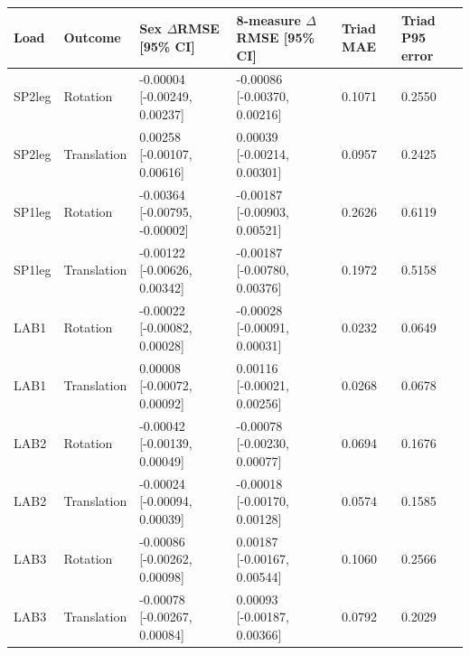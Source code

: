 \begin{tabular}{llllll}
\toprule
Load & Outcome & Sex $\Delta$RMSE [95\% CI] & 8-measure $\Delta$RMSE [95\% CI] & Triad MAE & Triad P95 error \\
\midrule
SP2leg & Rotation & -0.00004 [-0.00249, 0.00237] & -0.00086 [-0.00370, 0.00216] & 0.1071 & 0.2550 \\
SP2leg & Translation & 0.00258 [-0.00107, 0.00616] & 0.00039 [-0.00214, 0.00301] & 0.0957 & 0.2425 \\
SP1leg & Rotation & -0.00364 [-0.00795, -0.00002] & -0.00187 [-0.00903, 0.00521] & 0.2626 & 0.6119 \\
SP1leg & Translation & -0.00122 [-0.00626, 0.00342] & -0.00187 [-0.00780, 0.00376] & 0.1972 & 0.5158 \\
LAB1 & Rotation & -0.00022 [-0.00082, 0.00028] & -0.00028 [-0.00091, 0.00031] & 0.0232 & 0.0649 \\
LAB1 & Translation & 0.00008 [-0.00072, 0.00092] & 0.00116 [-0.00021, 0.00256] & 0.0268 & 0.0678 \\
LAB2 & Rotation & -0.00042 [-0.00139, 0.00049] & -0.00078 [-0.00230, 0.00077] & 0.0694 & 0.1676 \\
LAB2 & Translation & -0.00024 [-0.00094, 0.00039] & -0.00018 [-0.00170, 0.00128] & 0.0574 & 0.1585 \\
LAB3 & Rotation & -0.00086 [-0.00262, 0.00098] & 0.00187 [-0.00167, 0.00544] & 0.1060 & 0.2566 \\
LAB3 & Translation & -0.00078 [-0.00267, 0.00084] & 0.00093 [-0.00187, 0.00366] & 0.0792 & 0.2029 \\
\bottomrule
\end{tabular}
